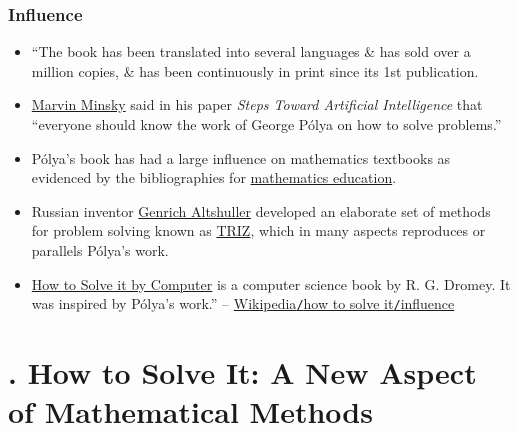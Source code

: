\documentclass[oneside]{book}
\numberwithin{equation}{section}
\begin{document}
\subsection{Influence}
\begin{itemize}
	\item ``The book has been translated into several languages \& has sold over a million copies, \& has been continuously in print since its 1st publication.
	\item \href{https://en.wikipedia.org/wiki/Marvin_Minsky}{Marvin Minsky} said in his paper \textit{Steps Toward Artificial Intelligence} that ``everyone should know the work of George P\'olya on how to solve problems.''
	\item P\'olya's book has had a large influence on mathematics textbooks as evidenced by the bibliographies for \href{https://en.wikipedia.org/wiki/Mathematics_education}{mathematics education}.
	\item Russian inventor \href{https://en.wikipedia.org/wiki/Genrich_Altshuller}{Genrich Altshuller} developed an elaborate set of methods for problem solving known as \href{https://en.wikipedia.org/wiki/TRIZ}{TRIZ}, which in many aspects reproduces or parallels P\'olya's work.
	\item \href{https://en.wikipedia.org/wiki/How_to_Solve_it_by_Computer}{How to Solve it by Computer} is a computer science book by R. G. Dromey. It was inspired by P\'olya's work.'' -- \href{https://en.wikipedia.org/wiki/How_to_Solve_It#Influence}{Wikipedia\texttt{/}how to solve it\texttt{/}influence}
\end{itemize}


\chapter{\cite{Polya2014}. How to Solve It: A New Aspect of Mathematical Methods}
\end{document}
